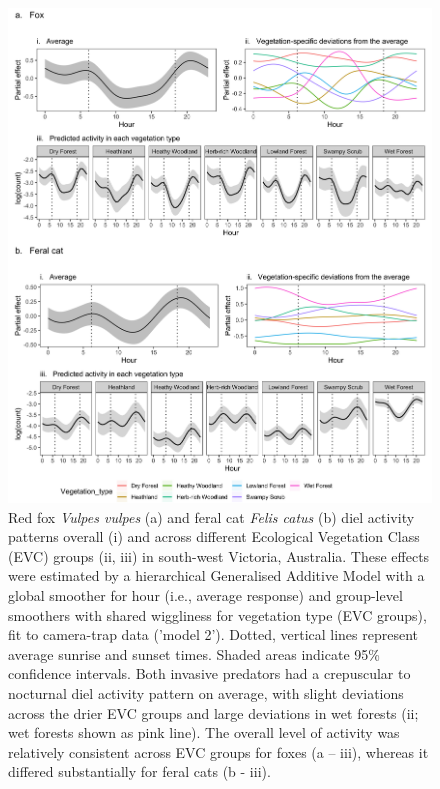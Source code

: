 \documentclass[preprint, 3p, authoryear]{elsarticle} %
\begin{document}
\begin{figure}

{\centering \includegraphics[width=0.8\linewidth]{../figs/predator_veg_leg} 

}

\caption{Red fox \textit{Vulpes vulpes} (a) and feral cat \textit{Felis catus} (b) diel activity patterns overall (i) and across different Ecological Vegetation Class (EVC) groups (ii, iii) in south-west Victoria, Australia. These effects were estimated by a hierarchical Generalised Additive Model with a global smoother for hour (i.e., average response) and group-level smoothers with shared wiggliness for vegetation type (EVC groups), fit to camera-trap data ('model 2'). Dotted, vertical lines represent average sunrise and sunset times. Shaded areas indicate 95\% confidence intervals. Both invasive predators had a crepuscular to nocturnal diel activity pattern on average, with slight deviations across the drier EVC groups and large deviations in wet forests (ii; wet forests shown as pink line). The overall level of activity was relatively consistent across EVC groups for foxes (a – iii), whereas it differed substantially for feral cats (b - iii).}\label{fig:diel-veg}
\end{figure}

\newpage
\end{document}
